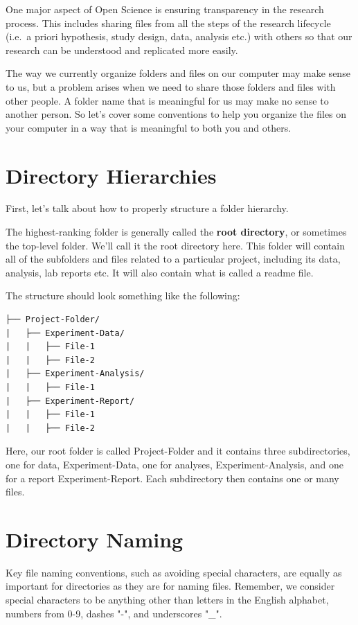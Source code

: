 \documentclass[
]{book}
\begin{document}
One major aspect of Open Science is ensuring transparency in the research process. This includes sharing files from all the steps of the research lifecycle (i.e.~a priori hypothesis, study design, data, analysis etc.) with others so that our research can be understood and replicated more easily.

The way we currently organize folders and files on our computer may make sense to us, but a problem arises when we need to share those folders and files with other people. A folder name that is meaningful for us may make no sense to another person. So let's cover some conventions to help you organize the files on your computer in a way that is meaningful to both you and others.

\section{Directory Hierarchies}\label{directory-hierarchies}

First, let's talk about how to properly structure a folder hierarchy.

The highest-ranking folder is generally called the \textbf{root directory}, or sometimes the top-level folder. We'll call it the root directory here. This folder will contain all of the subfolders and files related to a particular project, including its data, analysis, lab reports etc. It will also contain what is called a readme file.

The structure should look something like the following:

\begin{verbatim}
├── Project-Folder/
|   ├── Experiment-Data/
|   |   ├── File-1
|   |   ├── File-2
|   ├── Experiment-Analysis/
|   |   ├── File-1
|   ├── Experiment-Report/
|   |   ├── File-1
|   |   ├── File-2
\end{verbatim}

Here, our root folder is called Project-Folder and it contains three subdirectories, one for data, Experiment-Data, one for analyses, Experiment-Analysis, and one for a report Experiment-Report. Each subdirectory then contains one or many files.

\section{Directory Naming}\label{directory-naming}

Key file naming conventions, such as avoiding special characters, are equally as important for directories as they are for naming files. Remember, we consider special characters to be anything other than letters in the English alphabet, numbers from 0-9, dashes "-", and underscores "\_".
\end{document}
